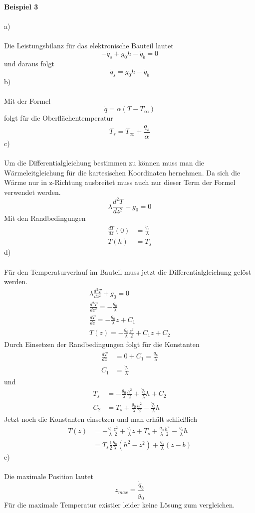 \textbf{Beispiel 3}\\ \\
a)\\ \\
Die Leistungsbilanz für das elektronische Bauteil lautet
\[
	-\dot{q}_s + g_0h - \dot{q}_b = 0
\]
und daraus folgt
\[
	\dot{q}_s = g_0h - \dot{q}_b
\]
b) \\ \\
Mit der Formel
\[
	\dot{q} = \alpha (T - T_\infty)
\]
folgt für die Oberflächentemperatur
\[
	T_s = T_\infty + \frac{\dot{q}_s}{\alpha}
\]
\newpage
\noindent
c)\\ \\
Um die Differentialgleichung bestimmen zu können muss man die Wärmeleitgleichung für die kartesischen Koordinaten hernehmen. Da sich die Wärme nur in z-Richtung ausbreitet muss auch nur dieser Term der Formel verwendet werden.
\[
	\lambda\frac{d^2T}{dz^2} + g_0 = 0
\]
Mit den Randbedingungen
\begin{align*}
	\frac{dT}{dz}(0) &= \frac{\dot{q}_b}{\lambda} \\
	T(h) &= T_s
\end{align*}
d) \\ \\
Für den Temperaturverlauf im Bauteil muss jetzt die Differentialgleichung gelöst werden.
\begin{align*}
		\lambda\frac{d^2T}{dz^2} + g_0 = 0 \\
		\frac{d^2T}{dz^2} = -\frac{g_0}{\lambda} \\
		\frac{dT}{dz} = -\frac{g_0}{\lambda}z + C_1 \\
		T(z) = -\frac{g_0}{\lambda}\frac{z^2}{2} + C_1z + C_2
\end{align*}
Durch Einsetzen der Randbedingungen folgt für die Konstanten
\begin{align*}
	\frac{dT}{dz} &= 0 + C_1 = \frac{\dot{q}_b}{\lambda} \\
	C_1 &= \frac{\dot{q}_b}{\lambda} 
\end{align*}
und
\begin{align*}
	T_s &= -\frac{g_0}{\lambda}\frac{h^2}{2} + \frac{\dot{q}_b}{\lambda}h + C_2 \\
	C_2 &= T_s + \frac{g_0}{\lambda}\frac{h^2}{2} - \frac{\dot{q}_b}{\lambda}h
\end{align*}
Jetzt noch die Konstanten einsetzen und man erhält schließlich
\begin{align*}
	T(z) &= -\frac{g_0}{\lambda}\frac{z^2}{2} + \frac{\dot{q}_b}{\lambda}z + T_s + \frac{g_0}{\lambda}\frac{h^2}{2} - \frac{\dot{q}_b}{\lambda}h \\
	&= T_s \frac{1}{2}\frac{\dot{q}_b}{\lambda}(h^2 - z^2) + \frac{\dot{q}_b}{\lambda}(z - b)
\end{align*}
\newpage
\noindent
e) \\ \\
Die maximale Position lautet
\[
	z_{max} = \frac{\dot{q}_b}{g_0}
\]
Für die maximale Temperatur existier leider keine Lösung zum vergleichen. \\ \\
